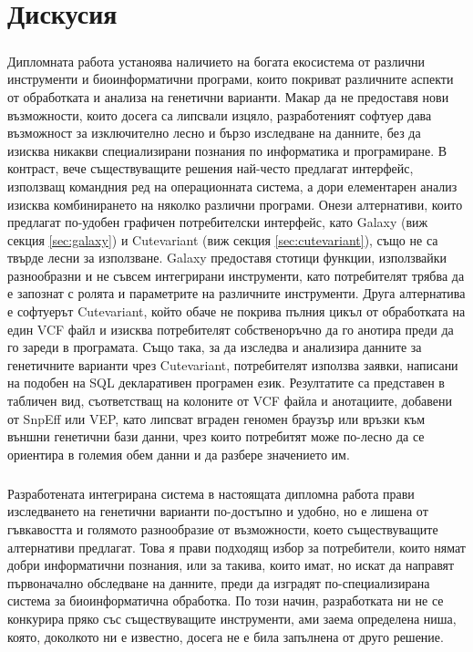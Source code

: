 \documentclass[pdftex,cyrillic,14pt,a4page,twoside,openright]{extreport}
\begin{document}
\chapter{Дискусия}
\paragraph{}
Дипломната работа устаноява наличието на богата екосистема от различни инструменти и биоинформатични програми, които покриват различните аспекти от обработката и анализа на генетични варианти. Макар да не предоставя нови възможности, които досега са липсвали изцяло, разработеният софтуер дава възможност за изключително лесно и бързо изследване на данните, без да изисква никакви специализирани познания по информатика и програмиране. В контраст, вече съществуващите решения най-често предлагат интерфейс, използващ командния ред на операционната система, а дори елементарен анализ изисква комбинирането на няколко различни програми. Онези алтернативи, които предлагат по-удобен графичен потребителски интерфейс, като Galaxy (виж секция \ref{sec:galaxy}) и Cutevariant (виж секция \ref{sec:cutevariant}), също не са твърде лесни за използване. Galaxy предоставя стотици функции, използвайки разнообразни и не съвсем интегрирани инструменти, като потребителят трябва да е запознат с ролята и параметрите на различните инструменти. Друга алтернатива е софтуерът Cutevariant, който обаче не покрива пълния цикъл от обработката на един VCF файл и изисква потребителят собственоръчно да го анотира преди да го зареди в програмата. Също така, за да изследва и анализира данните за генетичните варианти чрез Cutevariant, потребителят използва заявки, написани на подобен на SQL декларативен програмен език. Резултатите са представен в табличен вид, съответстващ на колоните от VCF файла и анотациите, добавени от SnpEff или VEP, като липсват вграден геномен браузър или връзки към външни генетични бази данни, чрез които потребитят може по-лесно да се ориентира в големия обем данни и да разбере значението им.

\paragraph{}
Разработената интегрирана система в настоящата дипломна работа прави изследването на генетични варианти по-достъпно и удобно, но е лишена от гъвкавостта и голямото разнообразие от възможности, което съществуващите алтернативи предлагат. Това я прави подходящ избор за потребители, които нямат добри информатични познания, или за такива, които имат, но искат да направят първоначално обследване на данните, преди да изградят по-специализирана система за биоинформатична обработка. По този начин, разработката ни не се конкурира пряко със съществуващите инструменти, ами заема определена ниша, която, доколкото ни е известно, досега не е била запълнена от друго решение.
\end{document}
